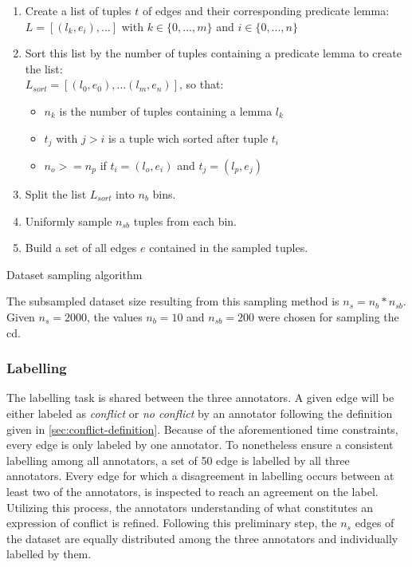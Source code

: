 \documentclass[11pt, numbers=noenddot]{scrreprt}
\begin{document}
\begin{algorithm}
\begin{enumerate}
	\item Create a list of tuples \(t\) of edges and their corresponding predicate lemma: \\ \(L = [(l_k, e_i), ...]\) with \(k \in \{0,...,m\}\) and \(i \in \{0,...,n\}\)
	\item Sort this list by the number of tuples containing a predicate lemma to create the list: \\ \(L_{sort} = [(l_0, e_0), ... (l_m, e_n)]\), so that:
	\begin{itemize}
		\item \(n_k\) is the number of tuples containing a lemma \(l_k\)
		\item \(t_j\) with \(j > i\) is a tuple wich sorted after tuple \(t_i\)
		\item \(n_o >= n_p\) if \(t_i = (l_o, e_i)\) and \(t_j = (l_p, e_j)\)
	\end{itemize}			
	\item Split the list \(L_{sort}\) into \(n_{b}\) bins.
	\item Uniformly sample \(n_{sb}\) tuples from each bin.
	\item Build a set of all edges \(e\) contained in the sampled tuples.
\end{enumerate}
\caption{Dataset sampling algorithm}
\label{algo:dataset-sampling}
\end{algorithm}

The subsampled dataset size resulting from this sampling method is \(n_{s} = n_{b} * n_{sb}\). Given \(n_{s} = 2000\), the values \(n_b = 10\) and \(n_{sb} = 200\) were chosen for sampling the \gls{cd}.


\subsubsection{Labelling}
The labelling task is shared between the three annotators. A given edge will be either labeled as \textit{conflict} or \textit{no conflict} by an annotator following the definition given in \cref{sec:conflict-definition}. Because of the aforementioned time constraints, every edge is only labeled by one annotator. To nonetheless ensure a consistent labelling among all annotators, a set of 50 edge is labelled by all three annotators. Every edge for which a disagreement in labelling occurs between at least two of the annotators, is inspected to reach an agreement on the label. Utilizing this process, the annotators understanding of what constitutes an expression of conflict is refined. Following this preliminary step, the \(n_s\) edges of the dataset are equally distributed among the three annotators and individually labelled by them.
\end{document}
